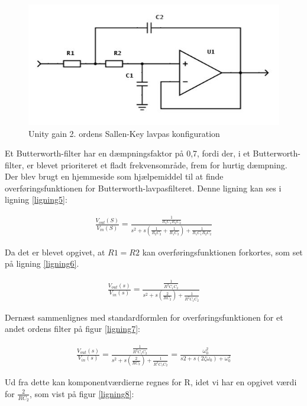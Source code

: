 \begin{figure}[H]
	\centering
	\includegraphics[width=1\textwidth]{Figurer/Hardware/FilterDesign}
	\caption{Unity gain 2. ordens Sallen-Key lavpas konfiguration}
	\label{fig:Filter}
\end{figure}

Et Butterworth-filter har en dæmpningsfaktor på 0,7, fordi der, i et Butterworth-filter, er blevet prioriteret et fladt frekvensområde, frem for hurtig dæmpning. Der blev brugt en hjemmeside som hjælpemiddel til at finde overføringsfunktionen for Butterworth-lavpasfilteret.\cite{Overforing} Denne ligning kan ses i ligning \ref{ligning5}:


\begin{align}
	\frac{V_{out}(S)}{V_{in}(S)}=\frac{\frac{1}{R_1C_1R_2C_2}}{s^2+s(\frac{1}{R_2C_2}+\frac{1}{R_1C_2})+\frac{1}{R_1C_1R_2C_2}}
	\label{ligning5}
\end{align}

Da det er blevet opgivet, at $R1=R2$ kan overføringsfunktionen forkortes, som set på ligning \ref{ligning6}.

\begin{align}
\frac{V_{out}(s)}{V_{in}(s)}=\frac{\frac{1}{R^2C_{1}C_{2}}}{s^2+s(\frac{2}{RC_{2}})+\frac{1}{R^2C_{1}C_{2}}}
\label{ligning6}
\end{align}

Dernæst sammenlignes med standardformlen for overføringsfunktionen for et andet ordens filter på figur \ref{ligning7}:

\begin{align}
\frac{V_{out}(s)}{V_{in}(s)} = \frac{\frac{1}{R^{2}C_{1} C_{2}}}{s^2+s(\frac{2}{RC_{2}})+\frac{1}{R^{2}C_{1}C_{2}}} = \frac{\omega_{0}^{2}}{s{2}+s(2\zeta\omega_{0})+\omega_{0}^{2}}
\label{ligning7}
\end{align}

Ud fra dette kan komponentværdierne regnes for R, idet vi har en opgivet værdi for $\frac{2}{RC_{2}}$, som vist på figur \ref{ligning8}:

